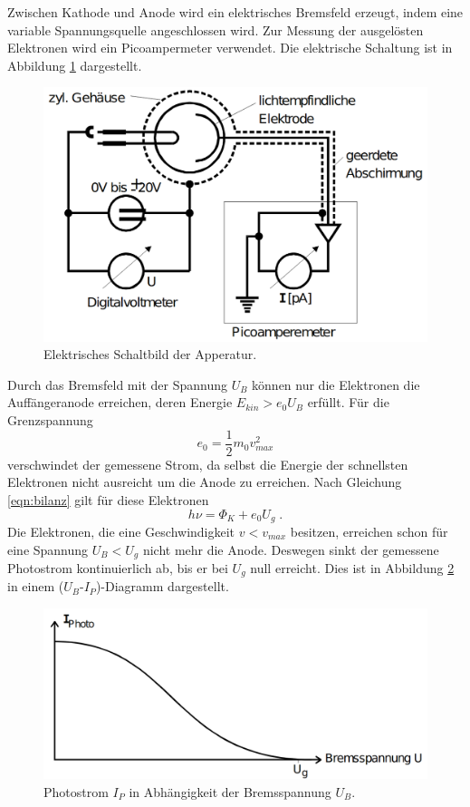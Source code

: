 \noindent
Zwischen Kathode und Anode wird ein elektrisches Bremsfeld erzeugt, indem eine variable Spannungsquelle angeschlossen wird. Zur Messung der 
ausgelösten Elektronen wird ein Picoampermeter verwendet. Die elektrische Schaltung ist in Abbildung \ref{fig:Schaltung} dargestellt. 
\begin{figure}
    \centering
    \includegraphics[scale=0.3]{pictures/ElektischeSchaltung.png}
    \caption{Elektrisches Schaltbild der Apperatur. \cite{AP01}}
    \label{fig:Schaltung}
\end{figure}

\noindent
Durch das Bremsfeld mit der Spannung $U_B$ können nur die Elektronen die Auffängeranode erreichen, deren Energie $E_{kin}>e_0U_B$ erfüllt.
Für die Grenzspannung 
\begin{equation}
    e_0=\frac{1}{2}m_0v_{max}^2 
\end{equation}
verschwindet der gemessene Strom, da selbst die Energie der schnellsten Elektronen nicht ausreicht um die Anode zu erreichen. Nach 
Gleichung \eqref{eqn:bilanz} gilt für diese Elektronen 
\begin{equation}
    h\nu=\Phi_K+e_0U_g\;.
\end{equation}
Die Elektronen, die eine Geschwindigkeit $v<v_{max}$ besitzen, erreichen schon für eine Spannung $U_B<U_g$ nicht mehr die Anode. Deswegen 
sinkt der gemessene Photostrom kontinuierlich ab, bis er bei $U_g$ null erreicht. Dies ist in Abbildung \ref{fig:Photostrom} in einem 
($U_B$-$I_P$)-Diagramm dargestellt. 

\begin{figure}
    \centering
    \includegraphics[scale=0.3]{pictures/Photostrom.png}
    \caption{Photostrom $I_{P}$ in Abhängigkeit der Bremsspannung $U_B$. \cite{AP01}}
    \label{fig:Photostrom}
\end{figure}


